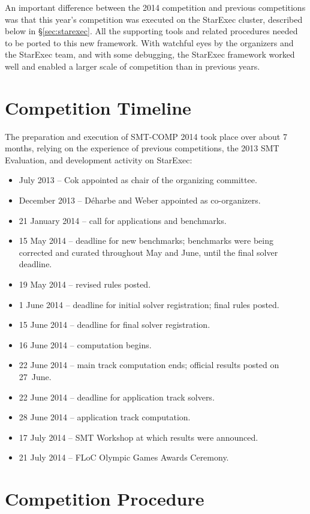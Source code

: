 \documentclass[twoside,11pt]{article}
\begin{document}
An important difference between the 2014 competition and previous competitions was that this year's competition was executed on the StarExec cluster, described below in \S\ref{sec:starexec}. All the supporting tools and related procedures needed to be ported to this new framework. With watchful eyes by the organizers and the StarExec team, and with some debugging, the StarExec framework worked well and enabled a larger scale of competition than in previous years.

\section{Competition Timeline}
\label{sec:timeline}

The preparation and execution of SMT-COMP 2014 took place over about 7 months, relying on the experience of previous competitions, the 2013 SMT Evaluation, and development activity on StarExec:
\begin{itemize}[noitemsep]
\item July 2013 -- Cok appointed as chair of the organizing committee.
\item December 2013 -- D\'{e}harbe and Weber appointed as co-organizers.
\item 21 January 2014 -- call for applications and benchmarks.
\item 15 May 2014 -- deadline for new benchmarks; benchmarks were being corrected and curated throughout May and June, until the final solver deadline.
\item 19 May 2014 -- revised rules posted.
\item 1 June 2014 -- deadline for initial solver registration; final rules posted.
\item 15 June 2014 -- deadline for final solver registration.
\item 16 June 2014 -- computation begins.
\item 22 June 2014 -- main track computation ends; official results posted on 27~June.
\item 22 June 2014 -- deadline for application track solvers.
\item 28 June 2014 -- application track computation.
\item 17 July 2014 -- SMT Workshop at which results were announced.
\item 21 July 2014 -- FLoC Olympic Games Awards Ceremony.
\end{itemize}

\section{Competition Procedure} 
\label{sec:procedure}
\end{document}
